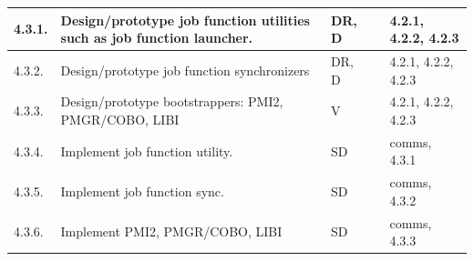 \begin{longtable}{|p{1cm}|p{10.2cm}|p{1cm}|p{1cm}|p{1.8cm}|}
  \hline
  4.3.1.& Design/prototype job function utilities such as job function
          launcher.
        & DR, D
        & 
        & 4.2.1, 4.2.2, 4.2.3 \\
  \hline
  4.3.2.& Design/prototype job function synchronizers
        & DR, D
        & 
        & 4.2.1, 4.2.2, 4.2.3 \\
  \hline
  4.3.3.& Design/prototype bootstrappers: PMI2, PMGR/COBO, LIBI
        & V
        & 
        & 4.2.1, 4.2.2, 4.2.3 \\
  \hline
  4.3.4.& Implement job function utility.
        & SD
        & 
        & comms, 4.3.1 \\
  \hline
  4.3.5.& Implement job function sync.
        & SD
        & 
        & comms, 4.3.2 \\
  \hline
  4.3.6.& Implement PMI2, PMGR/COBO, LIBI
        & SD
        & 
        & comms, 4.3.3 \\
  \hline
\end{longtable}
\fi
